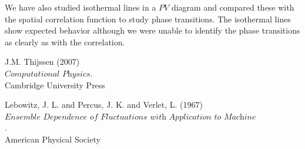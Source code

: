 \documentclass[12pt,a4paper]{report}
\begin{document}
We have also studied isothermal lines in a $PV$ diagram and compared these with the spatial correlation function to study phase transitions. The isothermal lines show expected behavior although we were unable to identify the phase transitions as clearly as with the correlation.

\newpage
\begin{thebibliography}{9}

 J.M. Thijssen (2007)\\
 $\textit{Computational Physics}$.\\
 Cambridge University Press
 
 Lebowitz, J. L. and Percus, J. K. and Verlet, L. (1967)\\
 $\textit{Ensemble Dependence of Fluctuations with Application to Machine Computations}$.\\
 American Physical Society
 \end{thebibliography}
\end{document}
